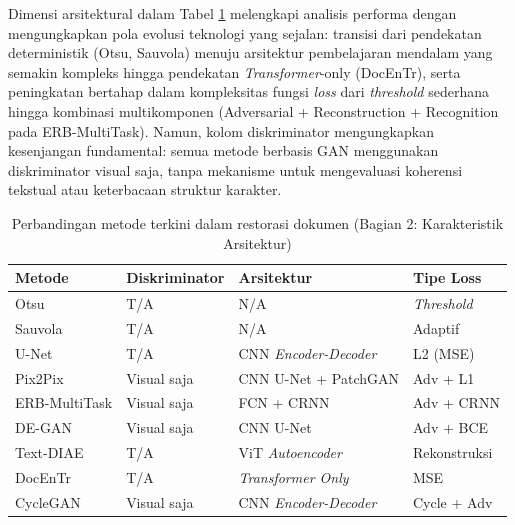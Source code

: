 \documentclass[12pt,a4paper]{article}
\begin{document}
Dimensi arsitektural dalam Tabel \ref{tab:sota-comparison-arch} melengkapi analisis performa dengan mengungkapkan pola evolusi teknologi yang sejalan: transisi dari pendekatan deterministik (Otsu, Sauvola) menuju arsitektur pembelajaran mendalam yang semakin kompleks hingga pendekatan \textit{Transformer}-only (DocEnTr), serta peningkatan bertahap dalam kompleksitas fungsi \textit{loss} dari \textit{threshold} sederhana hingga kombinasi multikomponen (Adversarial + Reconstruction + Recognition pada ERB-MultiTask). Namun, kolom diskriminator mengungkapkan kesenjangan fundamental: semua metode berbasis GAN menggunakan diskriminator visual saja, tanpa mekanisme untuk mengevaluasi koherensi tekstual atau keterbacaan struktur karakter.

\begin{table}[htbp]
      \centering
      \caption[Perbandingan Metode Restorasi (Karakteristik Arsitektur)]{Perbandingan metode terkini dalam restorasi dokumen (Bagian 2: Karakteristik Arsitektur)}
      \label{tab:sota-comparison-arch}
      \footnotesize
            \begin{tabularx}{\textwidth}{|>{\raggedright\arraybackslash}X|>{\centering\arraybackslash}p{2.3cm}|>{\raggedright\arraybackslash}X|>{\centering\arraybackslash}p{2.2cm}|}
                  \hline
                  \textbf{Metode} & \textbf{Diskriminator} & \textbf{Arsitektur} & \textbf{Tipe Loss} \\ \hline
                  Otsu \parencite{otsu1979}          & T/A                    & N/A                  & \textit{Threshold}          \\ \hline
                  Sauvola \parencite{sauvola2000}    & T/A                    & N/A                  & Adaptif            \\ \hline
                  U-Net \parencite{ronneberger2015}           & T/A                    & CNN \textit{Encoder-Decoder}  & L2 (MSE)           \\ \hline
                  Pix2Pix \parencite{isola2017}      & Visual saja            & CNN U-Net + PatchGAN & Adv + L1           \\ \hline
                  ERB-MultiTask \parencite{erb2021}           & Visual saja            & FCN + CRNN           & Adv + CRNN         \\ \hline
                  DE-GAN \parencite{souibgui2021}             & Visual saja            & CNN U-Net            & Adv + BCE          \\ \hline
                  Text-DIAE \parencite{textdiae2022} & T/A                    & ViT \textit{Autoencoder}      & Rekonstruksi       \\ \hline
                  DocEnTr \parencite{docentr2022}    & T/A                    & \textit{Transformer Only}     & MSE                \\ \hline
                  CycleGAN \parencite{zhu2017}       & Visual saja            & CNN \textit{Encoder-Decoder}  & Cycle + Adv        \\ \hline
            \end{tabularx}


\end{table}
\end{document}
